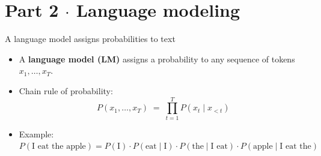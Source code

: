 \section{Part 2 $\cdot$ Language modeling}

\begin{frame}{A language model assigns probabilities to text}
\begin{itemize}\setlength{\itemsep}{6pt}
  \item A \textbf{language model (LM)} assigns a probability to any sequence of tokens $x_1, \dots, x_T$.
  \item Chain rule of probability:
  \[
    P(x_1,\dots,x_T) \;=\; \prod_{t=1}^{T} P(x_t \mid x_{<t})
  \]
  \item Example: \; $P(\text{I eat the apple}) = P(\text{I})\cdot P(\text{eat}\mid\text{I})\cdot P(\text{the}\mid\text{I eat})\cdot P(\text{apple}\mid\text{I eat the})$
\end{itemize}
\vspace{8pt}
\end{frame}

